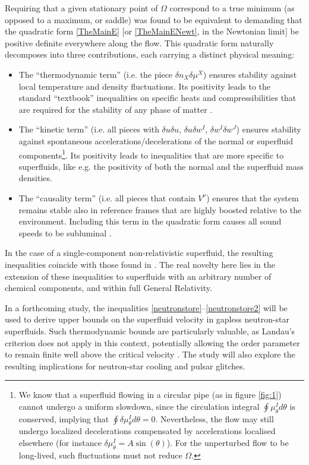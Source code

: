 \documentclass[a4paper, amsfonts, amssymb, amsmath, reprint, showkeys, nofootinbib, twoside,notitlepage,onecolumn]{revtex4-2}
\theoremstyle{definition}
\theoremstyle{theorem}
\theoremstyle{corollary}
\begin{document}
{Requiring that a given stationary point of $\Omega$ correspond to a true minimum (as opposed to a maximum, or saddle) was found to be equivalent to demanding that the quadratic form \eqref{TheMainE} [or \eqref{TheMainENewt}, in the Newtonian limit] be positive definite everywhere along the flow. This quadratic form naturally decomposes into three contributions, each carrying a distinct physical meaning:
\begin{itemize}
\item The ``thermodynamic term'' (i.e. the piece $\delta n_X \delta \mu^X$) ensures stability against local temperature and density fluctuations. Its positivity leads to the standard ``textbook'' inequalities on specific heats and compressibilities that are required for the stability of any phase of matter \cite[\S 21]{landau5}.
\item  The ``kinetic term'' (i.e. all pieces with $\delta u\delta u$, $\delta u \delta w^I$, $\delta w^I\delta w^J$) ensures stability against spontaneous accelerations/decelerations of the normal or superfluid components\footnote{\color{black}We know that a superfluid flowing in a circular pipe (as in figure \ref{fig:1}) cannot undergo a uniform slowdown, since the circulation integral $\oint \mu_\theta^I d\theta$ is conserved, implying that $\oint \delta \mu_\theta^I d\theta=0$. Nevertheless, the flow may still undergo localized decelerations compensated by accelerations localised elsewhere (for instance $\delta\mu^I_\theta=A \sin(\theta)$). For the unperturbed flow to be long-lived, such fluctuations must not reduce $\Omega$.}. Its positivity leads to inequalities that are more specific to superfluids, like e.g. the positivity of both the normal and the superfluid mass densities. 
\item The ``causality term'' (i.e. all pieces that contain $V^\nu$) ensures that the system remains stable also in reference frames that are highly boosted relative to the environment. Including this term in the quadratic form causes all sound speeds to be subluminal \cite{GavassinoCausality2021,GavassinoUniversalityI2023,GavassinoSuperluminal2021,GavassinoBounds2023}. 
\end{itemize}
In the case of a single-component non-relativistic superfluid, the resulting inequalities coincide with those found in \cite{Andreev2004}. The real novelty here lies in the extension of these inequalities to superfluids with an arbitrary number of chemical components, and within full General Relativity.

In a forthcoming study, the inequalities \eqref{neutronstore}–\eqref{neutronstore2} will be used to derive upper bounds on the superfluid velocity in gapless neutron-star superfluids. Such thermodynamic bounds are particularly valuable, as Landau’s criterion does not apply in this context, potentially allowing the order parameter to remain finite well above the critical velocity \cite{AllardChamel2023PartI,AllardChamel2023PartII,AllardChamel2024EPJA,AllardChamel2024PRL,AllardChamel2025}. The study will also explore the resulting implications for neutron-star cooling and pulsar glitches.


}
\end{document}

